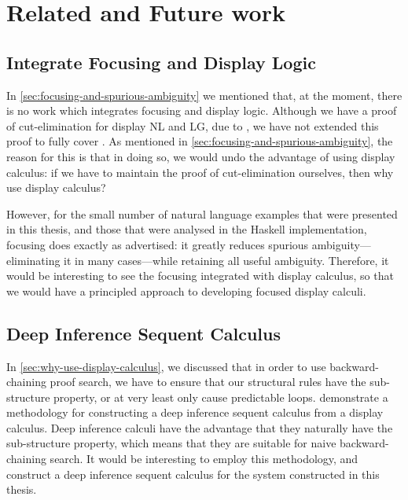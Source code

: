 \section{Related and Future work}
\label{sec:future-work}



\subsection*{Integrate Focusing and Display Logic}
In \autoref{sec:focusing-and-spurious-ambiguity} we mentioned that, at
the moment, there is no work which integrates focusing and display
logic. Although we have a proof of cut-elimination for display NL and
LG, due to \citet{bastenhof2011}, we have not extended this proof to
fully cover \NLBS.
As mentioned in \autoref{sec:focusing-and-spurious-ambiguity}, the
reason for this is that in doing so, we would undo the advantage of
using display calculus: if we have to maintain the proof of
cut-elimination ourselves, then why use display calculus?

However, for the small number of natural language examples that were
presented in this thesis, and those that were analysed in the Haskell
implementation, focusing does exactly as advertised: it greatly
reduces spurious ambiguity---eliminating it in many cases---while
retaining all useful ambiguity.
Therefore, it would be interesting to see the focusing integrated with
display calculus, so that we would have a principled approach to
developing focused display calculi.



\subsection*{Deep Inference Sequent Calculus}
In \autoref{sec:why-use-display-calculus}, we discussed that in order
to use backward-chaining proof search, we have to ensure that our
structural rules have the sub-structure property, or at very least
only cause predictable loops. \citet{gore2014} demonstrate a
methodology for constructing a deep inference sequent calculus from a
display calculus. Deep inference calculi have the advantage that they
naturally have the sub-structure property, which means that they are
suitable for naive backward-chaining search. It would be interesting
to employ this methodology, and construct a deep inference sequent
calculus for the system constructed in this thesis.



